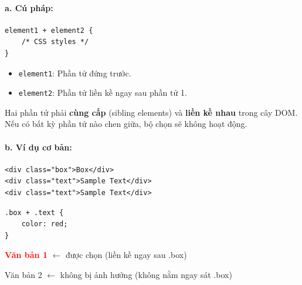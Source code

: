 \documentclass[11pt,oneside]{book}
\newcommand{\codeinline}[1]{\textcolor{accentOrange}{\texttt{#1}}}
\begin{document}
\paragraph{a. Cú pháp:}
\begin{codeWindow}
\begin{lstlisting}[language=CSS3]
element1 + element2 {
    /* CSS styles */
}
\end{lstlisting}
\end{codeWindow}

\begin{itemize}[leftmargin=1.5em, itemsep=2pt, parsep=0pt]
    \item \codeinline{element1}: Phần tử đứng trước.
    \item \codeinline{element2}: Phần tử liền kề ngay sau phần tử 1.
\end{itemize}

\begin{noteBox}
Hai phần tử phải \textbf{cùng cấp} (sibling elements) và \textbf{liền kề nhau} trong cây DOM. Nếu có bất kỳ phần tử nào chen giữa, bộ chọn sẽ không hoạt động.
\end{noteBox}

\paragraph{b. Ví dụ cơ bản:}
\begin{codeWindow}
\begin{lstlisting}[language=HTML5]
<div class="box">Box</div>
<div class="text">Sample Text</div>
<div class="text">Sample Text</div>
\end{lstlisting}

\begin{lstlisting}[language=CSS3]
.box + .text {
    color: red;
}
\end{lstlisting}
\end{codeWindow}

\begin{browserWindow}
\sffamily\small
{} \par\vspace{4pt}
\textcolor{red}{\textbf{Văn bản 1}} {\small\textcolor{gray!60}{$\leftarrow$ được chọn (liền kề ngay sau .box)}} \par\vspace{2pt}
\textcolor{darkText}{Văn bản 2} {\small\textcolor{gray!60}{$\leftarrow$ không bị ảnh hưởng (không nằm ngay sát .box)}} \par\vspace{4pt}
\end{browserWindow}
\end{document}
